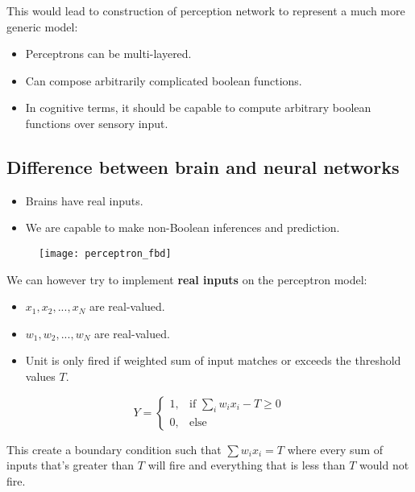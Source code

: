 This would lead to construction of perception network to represent a much more generic model:
\begin{itemize}
	\item Perceptrons can be multi-layered.
	\item Can compose arbitrarily complicated boolean functions.
	\item In cognitive terms, it should be capable to compute arbitrary boolean functions over sensory input.
\end{itemize}

\subsection{Difference between brain and neural networks}
\begin{itemize}
	\item Brains have real inputs.
	\item We are capable to make non-Boolean inferences and prediction.
\end{itemize}

\begin{figure}[h]
	\centering
	\texttt{[image: perceptron\_fbd]}
\end{figure}

\noindent We can however try to implement \textbf{real inputs} on the perceptron model:
\begin{itemize}
	\item $x_1,x_2,...,x_N$ are real-valued.
	\item $w_1,w_2,...,w_N$ are real-valued.
	\item Unit is only fired if weighted sum of input matches or exceeds the threshold values $T$.
\end{itemize}

\begin{equation}
Y = 
\begin{cases} 
	1, & \text{if } \sum_{i}w_ix_i - T \geq 0 \\
	0, & \text{else }
\end{cases}
\end{equation}

\hfill\break
This create a boundary condition such that $\sum w_ix_i = T$ where every sum of inputs that's greater than $T$ will fire and everything that is less than $T$ would not fire.

